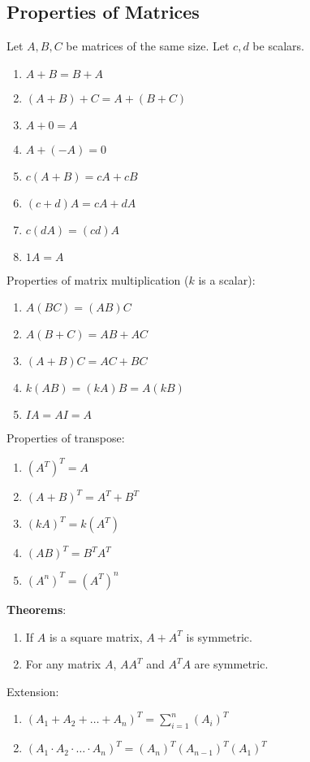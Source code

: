 \documentclass[letterpaper, 12pt]{math}
\begin{document}
\subsection*{Properties of Matrices}
Let \( A,B,C \) be matrices of the same size. Let \( c,d \) be scalars.
\begin{enumerate}
  \item \( A+B = B+A \)
  \item \( (A+B)+C = A+(B+C) \)
  \item \( A+0 = A \)
  \item \( A+(-A) = 0 \)
  \item \( c(A+B) = cA+cB \)
  \item \( (c+d)A = cA+dA \)
  \item \( c(dA) = (cd)A \)
  \item \( 1A = A \)
\end{enumerate}
Properties of matrix multiplication (\( k \) is a scalar):
\begin{enumerate}
  \item \( A(BC) = (AB)C \)
  \item \( A(B+C) = AB+AC \)
  \item \( (A+B)C = AC+BC \)
  \item \( k(AB) = (kA)B = A(kB) \)
  \item \( IA = AI = A \)
\end{enumerate}
Properties of transpose:
\begin{enumerate}
  \item \( (A^T)^T = A \)
  \item \( (A+B)^T = A^T+B^T \)
  \item \( (kA)^T = k(A^T) \)
  \item \( (AB)^T = B^TA^T \)
  \item \( (A^n)^T = (A^T)^n \)
\end{enumerate}
\textbf{Theorems}:
\begin{enumerate}
  \item If \( A \) is a square matrix, \( A+A^T \) is symmetric.
  \item For any matrix \( A \), \( AA^T \) and \( A^TA \) are symmetric.
\end{enumerate}
Extension:
\begin{enumerate}
  \item \( (A_1+A_2+\dots+A_n)^T = \sum_{i=1}^{n}(A_i)^T \)
  \item \( (A_1\cdot A_2\cdot\dots\cdot A_n)^T = (A_n)^T(A_{n-1})^T(A_1)^T \)
\end{enumerate}
\end{document}

